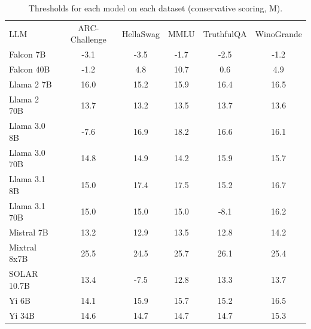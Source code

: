 \begin{table}[h]
\caption{Thresholds for each model on each dataset (conservative scoring, M). }
\label{tab:thresholds_logit_max_k20_w2}
\centering
\begin{tabular}{l S[table-format=3.1] S[table-format=3.1] S[table-format=3.1] S[table-format=3.1] S[table-format=3.1]}
\toprule
LLM & ARC-Challenge & HellaSwag & MMLU & TruthfulQA & WinoGrande \\ 
\cmidrule(lr){1-1} \cmidrule(lr){2-2} \cmidrule(lr){3-3} \cmidrule(lr){4-4} \cmidrule(lr){5-5} \cmidrule(lr){6-6}
Falcon 7B & -3.1 & -3.5 & -1.7 & -2.5 & -1.2\\
Falcon 40B & -1.2 & 4.8 & 10.7 & 0.6 & 4.9\\
Llama 2 7B & 16.0 & 15.2 & 15.9 & 16.4 & 16.5\\
Llama 2 70B & 13.7 & 13.2 & 13.5 & 13.7 & 13.6\\
Llama 3.0 8B & -7.6 & 16.9 & 18.2 & 16.6 & 16.1\\
Llama 3.0 70B & 14.8 & 14.9 & 14.2 & 15.9 & 15.7\\
Llama 3.1 8B & 15.0 & 17.4 & 17.5 & 15.2 & 16.7\\
Llama 3.1 70B & 15.0 & 15.0 & 15.0 & -8.1 & 16.2\\
Mistral 7B & 13.2 & 12.9 & 13.5 & 12.8 & 14.2\\
Mixtral 8x7B & 25.5 & 24.5 & 25.7 & 26.1 & 25.4\\
SOLAR 10.7B & 13.4 & -7.5 & 12.8 & 13.3 & 13.7\\
Yi 6B & 14.1 & 15.9 & 15.7 & 15.2 & 16.5\\
Yi 34B & 14.6 & 14.7 & 14.7 & 14.7 & 15.3\\
\bottomrule
\end{tabular}
\end{table}
